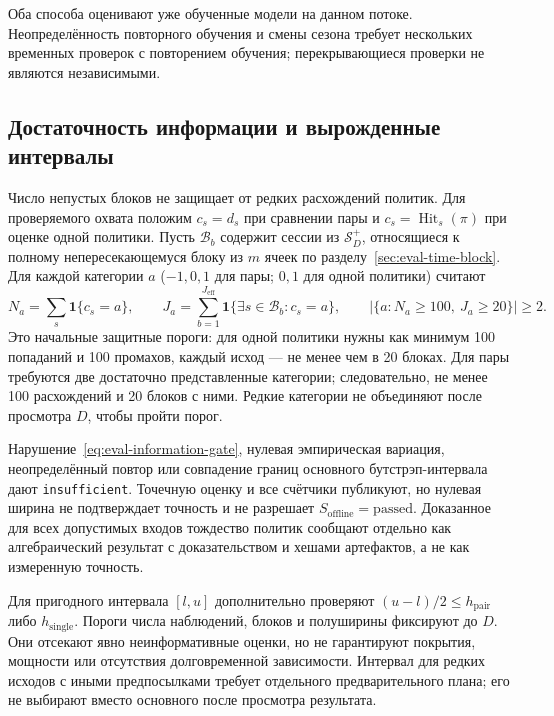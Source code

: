 \documentclass[12pt,a4paper]{article}
\newcommand{\code}[1]{{\ttfamily\small\nolinkurl{#1}}}
\newcommand{\ind}{\mathbf 1}
\theoremstyle{plainru}
\begin{document}
Оба способа оценивают уже обученные модели на данном потоке.
Неопределённость повторного обучения и смены сезона требует нескольких
временных проверок с повторением обучения; перекрывающиеся проверки
не являются независимыми.

\subsection{Достаточность информации и вырожденные интервалы}
\label{sec:eval-information}

Число непустых блоков не защищает от редких расхождений политик.
Для проверяемого охвата положим $c_s=d_s$ при сравнении пары и
$c_s=\operatorname{Hit}_s(\pi)$ при оценке одной политики.
Пусть $\mathcal B_b$ содержит сессии из $\mathcal S_D^+$, относящиеся к полному
непересекающемуся блоку из $m$ ячеек по разделу~\ref{sec:eval-time-block}.
Для каждой категории $a$ ($-1,0,1$ для пары; $0,1$ для одной политики)
считают
\begin{equation}\label{eq:eval-information-gate}
N_a=\sum_s\ind\{c_s=a\},\qquad
J_a=\sum_{b=1}^{J_{\mathrm{eff}}}
 \ind\{\exists s\in\mathcal B_b:c_s=a\},\qquad
\left|\{a:N_a\ge100,\ J_a\ge20\}\right|\ge2.
\end{equation}
Это начальные защитные пороги: для одной политики нужны как минимум
100 попаданий и 100 промахов, каждый исход --- не менее чем в 20 блоках.
Для пары требуются две достаточно представленные категории; следовательно,
не менее 100 расхождений и 20 блоков с ними. Редкие категории
не объединяют после просмотра $D$, чтобы пройти порог.

Нарушение~\eqref{eq:eval-information-gate}, нулевая эмпирическая вариация,
неопределённый повтор или совпадение границ основного бутстрэп-интервала
дают \code{insufficient}. Точечную оценку и все счётчики публикуют,
но нулевая ширина не подтверждает точность и не разрешает
$S_{\mathrm{offline}}=\mathrm{passed}$. Доказанное для всех допустимых входов
тождество политик сообщают отдельно как алгебраический результат
с доказательством и хешами артефактов, а не как измеренную точность.

Для пригодного интервала $[l,u]$ дополнительно проверяют
$(u-l)/2\le h_{\mathrm{pair}}$ либо $h_{\mathrm{single}}$.
Пороги числа наблюдений, блоков и полуширины фиксируют до $D$.
Они отсекают явно неинформативные оценки, но не гарантируют покрытия,
мощности или отсутствия долговременной зависимости. Интервал для редких
исходов с иными предпосылками требует отдельного предварительного плана;
его не выбирают вместо основного после просмотра результата.
\end{document}
